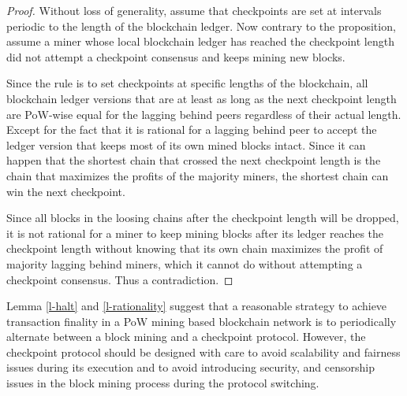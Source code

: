 \begin{proof}
Without loss of generality, assume that checkpoints are set at intervals periodic to the length of the blockchain ledger. Now contrary to the proposition, assume a miner whose local blockchain ledger has reached the checkpoint length did not attempt a checkpoint consensus and keeps mining new blocks. 

Since the rule is to set checkpoints at specific lengths of the blockchain, all blockchain ledger versions that are at least as long as the next checkpoint length are PoW-wise equal for the lagging behind peers regardless of their actual length. Except for the fact that it is rational for a lagging behind peer to accept the ledger version that keeps most of its own mined blocks intact. Since it can happen that the shortest chain that crossed the next checkpoint length is the chain that maximizes the profits of the majority miners, the shortest chain can win the next checkpoint. 

Since all blocks in the loosing chains after the checkpoint length will be dropped, it is not rational for a miner to keep mining blocks after its ledger reaches the checkpoint length without knowing that its own chain maximizes the profit of majority lagging behind miners, which it cannot do without attempting a checkpoint consensus. Thus a contradiction. 
\end{proof}

Lemma \ref{l-halt} and \ref{l-rationality} suggest that a reasonable strategy to achieve transaction finality in a PoW mining based blockchain network is to periodically alternate between a block mining and a checkpoint protocol. However, the checkpoint protocol should be designed with care to avoid scalability and fairness issues during its execution and to avoid introducing security, and censorship issues in the block mining process during the protocol switching.     

